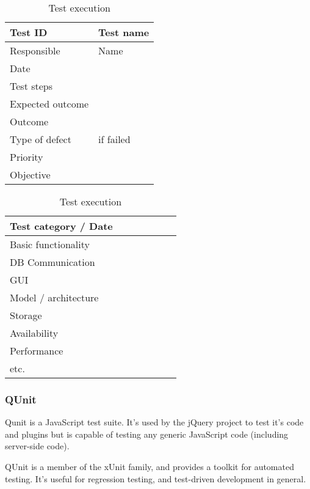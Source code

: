 \begin{table}[htb]
	\centering
    \begin{tabular}{| l | l |}
		\hline
		Test ID & Test name \\ \hline
		Responsible & Name \\ \hline
		Date & \\ \hline
		Test steps & \\ \hline
		Expected outcome & \\ \hline
		Outcome & \\ \hline
		Type of defect & if failed \\ \hline
		Priority & \\ \hline
		Objective &  \\ \hline
    \end{tabular}
  \caption{Test execution}
\end{table}

\begin{table}[htb]
	\centering
    \begin{tabular}{| l | l | l | l | l | l | l |}
		\hline
		Test category / Date & & & & & & \\ \hline
		Basic functionality & & & & & & \\ \hline
		DB Communication & & & & & & \\ \hline
		GUI & & & & & & \\ \hline
		Model / architecture & & & & & & \\ \hline
		Storage & & & & & & \\ \hline
		Availability & & & & & & \\ \hline
		Performance & & & & & & \\ \hline
		etc. & & & & & & \\ \hline
    \end{tabular}
  \caption{Test execution}
\end{table}

\subsubsection{QUnit}

	Qunit is a JavaScript test suite. It's used by the jQuery project to test
	it's code and plugins but is capable of testing any generic JavaScript code
	(including server-side code). \cite{jquery:qunit}

	QUnit is a member of the xUnit family, and provides a toolkit for automated
	testing. It's useful for regression testing, and test-driven development in
	general.

